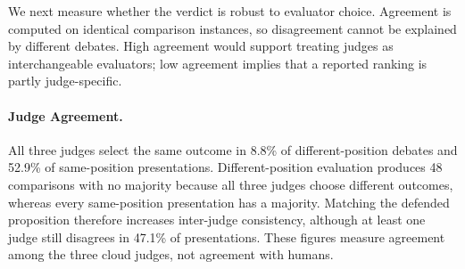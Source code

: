 \documentclass{article}
\begin{document}
We next measure whether the verdict is robust to evaluator choice. Agreement is computed on identical comparison instances, so disagreement cannot be explained by different debates. High agreement would support treating judges as interchangeable evaluators; low agreement implies that a reported ranking is partly judge-specific.

\paragraph{Judge Agreement.}
All three judges select the same outcome in 8.8\% of different-position debates and 52.9\% of same-position presentations. Different-position evaluation produces 48 comparisons with no majority because all three judges choose different outcomes, whereas every same-position presentation has a majority. Matching the defended proposition therefore increases inter-judge consistency, although at least one judge still disagrees in 47.1\% of presentations. These figures measure agreement among the three cloud judges, not agreement with humans.

\end{document}
